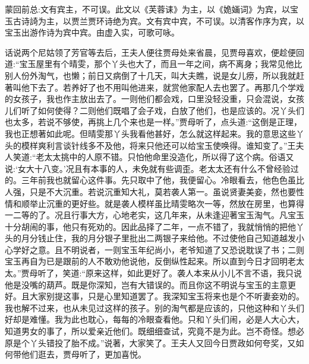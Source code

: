 

\begin{parag}
    \begin{note}蒙回前总:文有宾主，不可误。此文以《芙蓉诔》为主，以《姽婳词》为宾，以宝玉古诗䛴为主，以贾兰贾环诗绝为宾。文有宾中宾，不可误。以清客作序为宾，以宝玉出游作诗为宾中宾。由虚入实，可歌可咏。\end{note}
\end{parag}


\begin{parag}
    话说两个尼姑领了芳官等去后，王夫人便往贾母处来省晨，见贾母喜欢，便趁便回道:“宝玉屋里有个晴雯，那个丫头也大了，而且一年之间，病不离身；我常见他比别人份外淘气，也懒；前日又病倒了十几天，叫大夫瞧，说是女儿痨，所以我就赶著叫他下去了。若养好了也不用叫他进来，就赏他家配人去也罢了。再那几个学戏的女孩子，我也作主放出去了。一则他们都会戏，口里没轻没重，只会混说，女孩儿们听了如何使得？二则他们既唱了会子戏，白放了他们，也是应该的。况丫头们也太多，若说不够使，再挑上几个来也是一样。”贾母听了，点头道:“这倒是正理，我也正想著如此呢。但晴雯那丫头我看他甚好，怎么就这样起来。我的意思这些丫头的模样爽利言谈针线多不及他，将来只他还可以给宝玉使唤得。谁知变了。”王夫人笑道:“老太太挑中的人原不错。只怕他命里没造化，所以得了这个病。俗语又说:‘女大十八变。’况且有本事的人，未免就有些调歪。老太太还有什么不曾经验过的。三年前我也就留心这件事。先只取中了他，我便留心。冷眼看去，他色色虽比人强，只是不大沉重。若说沉重知大礼，莫若袭人第一。虽说贤妻美妾，然也要性情和顺举止沉重的更好些。就是袭人模样虽比晴雯略次一等，然放在房里，也算得一二等的了。况且行事大方，心地老实，这几年来，从未逢迎著宝玉淘气。凡宝玉十分胡闹的事，他只有死劝的。因此品择了二年，一点不错了，我就悄悄的把他丫头的月分钱止住，我的月分银子里批出二两银子来给他。不过使他自己知道越发小心学好之意。且不明说者，一则宝玉年纪尚小，老爷知道了又恐说耽误了书；二则宝玉再自为已是跟前的人不敢劝他说他，反倒纵性起来。所以直到今日才回明老太太。”贾母听了，笑道:“原来这样，如此更好了。袭人本来从小儿不言不语，我只说他是没嘴的葫芦。既是你深知，岂有大错误的。而且你这不明说与宝玉的主意更好。且大家别提这事，只是心里知道罢了。我深知宝玉将来也是个不听妻妾劝的。我也解不过来，也从未见过这样的孩子。别的淘气都是应该的，只他这种和丫头们好却是难懂。我为此也耽心，每每的冷眼查看他。只和丫头们闹，必是人大心大，知道男女的事了，所以爱亲近他们。既细细查试，究竟不是为此。岂不奇怪。想必原是个丫头错投了胎不成。”说著，大家笑了。王夫人又回今日贾政如何夸奖，又如何带他们逛去，贾母听了，更加喜悦。
\end{parag}


